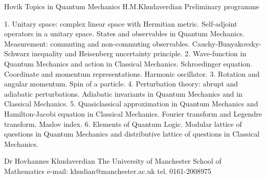                           Hovik
                    Topics in Quantum Mechanics
                    H.M.Khudaverdian
    Preliminary programme

         1. Unitary space: complex linear space with Hermitian metric.
Self-adjoint operators in a unitary space. States and observables in
Quantum Mechanics. Measurement: commuting and non-commuting observables.
Cauchy-Bunyakovsky-Schwarz inequality and Heisenberg uncertainty principle.
         2. Wave-function in Quantum Mechanics and action in Classical
Mechanics. Schroedinger equation. Coordinate and momentum
representations. Harmonic oscillator.
         3. Rotation and angular momentum. Spin of a particle.
         4. Perturbation theory: abrupt and adiabatic perturbations.
Adiabatic invariants in Quantum Mechanics and in Classical Mechanics.
         5. Quasiclassical approximation in Quantum Mechanics and
Hamilton-Jacobi equation in Classical Mechanics. Fourier transform and
Legendre transform. Maslov index.
         6. Elements of Quantum Logic. Modular lattice of questions
in Quantum Mechanics and distributive lattice of
questions in  Classical Mechanics.




                                       Dr Hovhannes Khudaverdian
                                       The University of Manchester
                                          School of Mathematics
                                      e-mail: khudian@manchester.ac.uk
                                           tel. 0161-2008975
